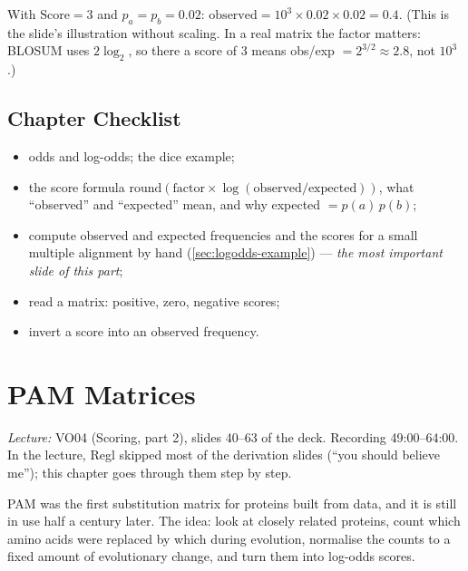 \documentclass[11pt, oneside]{book}
\newcommand{\obs}{\mathrm{observed}}
\newcommand{\expd}{\mathrm{expected}}
\newcommand{\lectureref}[1]{%
  \par{\small\color{gray!70!black}\textit{Lecture:} #1}\par}
\let\originalsection\section
\renewcommand{\section}{\Needspace{7\baselineskip}\originalsection}
\begin{document}
\begin{exbox}[title={Score 3}]
With $\mathrm{Score} = 3$ and $p_a = p_b = 0.02$:
$\obs = 10^3 \times 0.02 \times 0.02 = 0.4$. (This is the slide's illustration
without scaling. In a real matrix the factor matters: BLOSUM uses
$2\log_2$, so there a score of 3 means obs/exp $= 2^{3/2} \approx 2.8$, not
$10^3$.)
\end{exbox}

\section{Chapter Checklist}

\begin{itemize}
  \item odds and log-odds; the dice example;
  \item the score formula $\mathrm{round}(\text{factor} \times
    \log(\obs/\expd))$, what ``observed'' and ``expected'' mean, and why
    expected $= p(a)\,p(b)$;
  \item compute observed and expected frequencies and the scores for a small
    multiple alignment by hand (\cref{sec:logodds-example}) ---
    \emph{the most important slide of this part};
  \item read a matrix: positive, zero, negative scores;
  \item invert a score into an observed frequency.
\end{itemize}

\chapter{PAM Matrices}
\label{ch:pam}

\lectureref{VO04 (Scoring, part 2), slides 40--63 of the deck. Recording
49:00--64:00. In the lecture, Regl skipped most of the derivation slides
(``you should believe me''); this chapter goes through them step by step.}

PAM was the first substitution matrix for proteins built from data, and it
is still in use half a century later. The idea: look at closely related
proteins, count which amino acids were replaced by which during evolution,
normalise the counts to a fixed amount of evolutionary change, and turn them
into log-odds scores.
\end{document}
